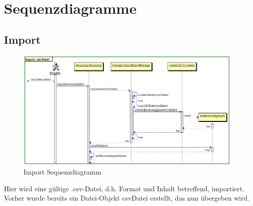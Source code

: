\documentclass[12pt,a4paper,titlepage]{article}
\begin{document}
\newpage
\section{Sequenzdiagramme}
\subsection{Import}
\begin{figure}[!ht]
\includegraphics[scale=0.5]{Sequenzdiagramme/Import_Sequenzdiagramm.png} \caption{Import Sequenzdiagramm} 
\end{figure}
Hier wird eine gültige .csv-Datei, d.h. Format und Inhalt betreffend, importiert. Vorher wurde bereits ein Datei-Objekt csvDatei erstellt, das nun übergeben wird.

\newpage
\end{document}
